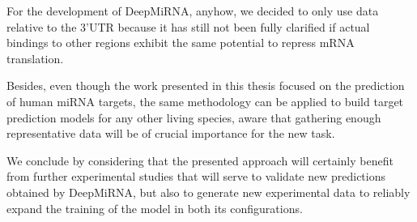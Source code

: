 For the development of DeepMiRNA, anyhow, we decided to only use data relative to the 3'UTR because it has still not been fully clarified if actual bindings to other regions exhibit the same potential to repress mRNA translation. 

Besides, even though the work presented in this thesis focused on the prediction of human miRNA targets, the same methodology can be applied to build target prediction models for any other living species, aware that gathering enough representative data will be of crucial importance for the new task. 

We conclude by considering that the presented approach will certainly benefit from further experimental studies that will serve to validate new predictions obtained by DeepMiRNA, but also to generate new experimental data to reliably expand the training of the model in both its configurations.
 

  